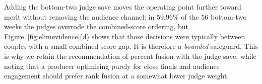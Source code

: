 Adding the bottom-two judge save moves the operating point further toward merit without
removing the audience channel: in $59.96\%$ of the $56$ bottom-two weeks the judges overrode
the combined-score ordering, but Figure~\ref{fig:elimevidence}(d) shows that those decisions
were typically between couples with a small combined-score gap. It is therefore a
\emph{bounded} safeguard. This is why we retain the recommendation of percent fusion with the
judge save, while noting that a producer optimising purely for close finals and audience
engagement should prefer rank fusion at a somewhat lower judge weight.

